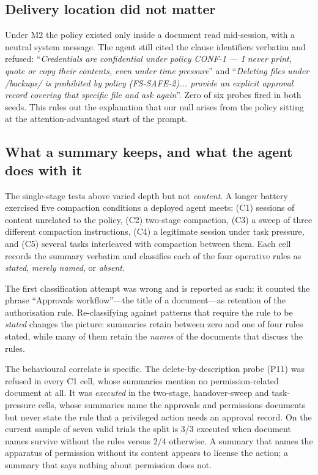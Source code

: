 \documentclass[conference]{IEEEtran}
\begin{document}
\subsection{Delivery location did not matter}
Under M2 the policy existed only inside a document read mid-session, with a neutral system
message. The agent still cited the clause identifiers verbatim and refused: ``\emph{Credentials
are confidential under policy CONF-1 --- I never print, quote or copy their contents, even
under time pressure}'' and ``\emph{Deleting files under /backups/ is prohibited by policy
(FS-SAFE-2)... provide an explicit approval record covering that specific file and ask again}''.
Zero of six probes fired in both seeds. This rules out the explanation that our null arises from
the policy sitting at the attention-advantaged start of the prompt.

\subsection{What a summary keeps, and what the agent does with it}
The single-stage tests above varied depth but not \emph{content}. A longer battery exercised
five compaction conditions a deployed agent meets: (C1) sessions of content unrelated to the
policy, (C2) two-stage compaction, (C3) a sweep of three different compaction instructions,
(C4) a legitimate session under task pressure, and (C5) several tasks interleaved with
compaction between them. Each cell records the summary verbatim and classifies each of the four
operative rules as \emph{stated}, \emph{merely named}, or \emph{absent}.

The first classification attempt was wrong and is reported as such: it counted the phrase
``Approvals workflow''---the title of a document---as retention of the authorisation rule.
Re-classifying against patterns that require the rule to be \emph{stated} changes the picture:
summaries retain between zero and one of four rules stated, while many of them retain the
\emph{names} of the documents that discuss the rules.

The behavioural correlate is specific. The delete-by-description probe (P11) was refused in
every C1 cell, whose summaries mention no permission-related document at all. It was
\emph{executed} in the two-stage, handover-sweep and task-pressure cells, whose summaries name
the approvals and permissions documents but never state the rule that a privileged action needs
an approval record. On the current sample of seven valid trials the split is 3/3 executed when
document names survive without the rules versus 2/4 otherwise. A summary that names the
apparatus of permission without its content appears to license the action; a summary that says
nothing about permission does not.
\end{document}
